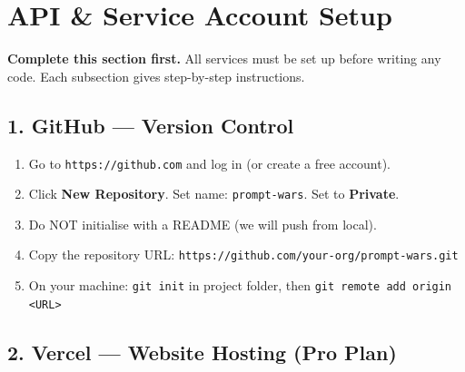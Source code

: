 \documentclass[11pt, a4paper]{article}
\begin{document}
\section{API \& Service Account Setup}

\textbf{Complete this section first.} All services must be set up before writing any code. Each subsection gives step-by-step instructions.

\subsection{1. GitHub --- Version Control}

\begin{tcolorbox}[stepbox, title={Step-by-Step: GitHub Repository Setup}]
\begin{enumerate}[leftmargin=1cm, itemsep=3pt]
    \item Go to \texttt{https://github.com} and log in (or create a free account).
    \item Click \textbf{New Repository}. Set name: \texttt{prompt-wars}. Set to \textbf{Private}.
    \item Do NOT initialise with a README (we will push from local).
    \item Copy the repository URL: \texttt{https://github.com/your-org/prompt-wars.git}
    \item On your machine: \texttt{git init} in project folder, then \texttt{git remote add origin <URL>}
\end{enumerate}
\end{tcolorbox}

\subsection{2. Vercel --- Website Hosting (Pro Plan)}
\end{document}
